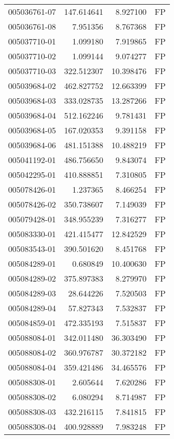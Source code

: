 \begin{tabular}{lrrl}
005036761-07 &  147.614641 &     8.927100 &   FP \\
005036761-08 &    7.951356 &     8.767368 &   FP \\
005037710-01 &    1.099180 &     7.919865 &   FP \\
005037710-02 &    1.099144 &     9.074277 &   FP \\
005037710-03 &  322.512307 &    10.398476 &   FP \\
005039684-02 &  462.827752 &    12.663399 &   FP \\
005039684-03 &  333.028735 &    13.287266 &   FP \\
005039684-04 &  512.162246 &     9.781431 &   FP \\
005039684-05 &  167.020353 &     9.391158 &   FP \\
005039684-06 &  481.151388 &    10.488219 &   FP \\
005041192-01 &  486.756650 &     9.843074 &   FP \\
005042295-01 &  410.888851 &     7.310805 &   FP \\
005078426-01 &    1.237365 &     8.466254 &   FP \\
005078426-02 &  350.738607 &     7.149039 &   FP \\
005079428-01 &  348.955239 &     7.316277 &   FP \\
005083330-01 &  421.415477 &    12.842529 &   FP \\
005083543-01 &  390.501620 &     8.451768 &   FP \\
005084289-01 &    0.680849 &    10.400630 &   FP \\
005084289-02 &  375.897383 &     8.279970 &   FP \\
005084289-03 &   28.644226 &     7.520503 &   FP \\
005084289-04 &   57.827343 &     7.532837 &   FP \\
005084859-01 &  472.335193 &     7.515837 &   FP \\
005088084-01 &  342.011480 &    36.303490 &   FP \\
005088084-02 &  360.976787 &    30.372182 &   FP \\
005088084-04 &  359.421486 &    34.465576 &   FP \\
005088308-01 &    2.605644 &     7.620286 &   FP \\
005088308-02 &    6.080294 &     8.714987 &   FP \\
005088308-03 &  432.216115 &     7.841815 &   FP \\
005088308-04 &  400.928889 &     7.983248 &   FP \\

\end{tabular}
